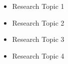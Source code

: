 \vspace{6pt}

\begin{itemize}
    \normalsize
    \item Research Topic 1
    \item Research Topic 2
    \item Research Topic 3
    \item Research Topic 4
\end{itemize}